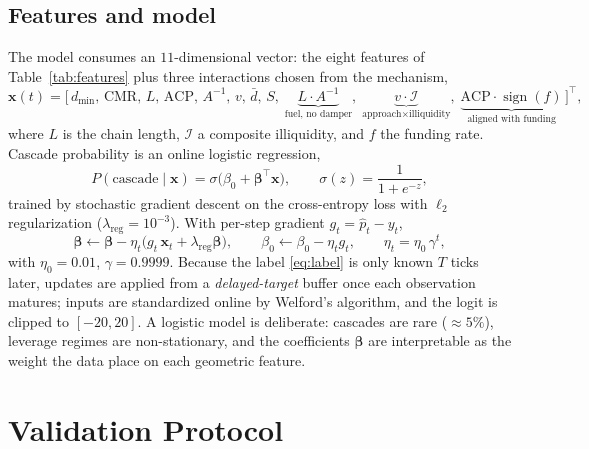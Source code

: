 \documentclass[11pt,a4paper]{article}
\theoremstyle{definition}
\theoremstyle{plain}
\newcommand{\sgn}{\operatorname{sign}}
\begin{document}
\subsection{Features and model}

The model consumes an $11$-dimensional vector: the eight features of Table~\ref{tab:features} plus
three interactions chosen from the mechanism,
\begin{equation}
  \mathbf{x}(t) = \big[\,d_{\min},\,\mathrm{CMR},\,L,\,\mathrm{ACP},\,A^{-1},\,v,\,\bar d,\,S,\;
                       \underbrace{L\!\cdot\!A^{-1}}_{\text{fuel, no damper}},\;
                       \underbrace{v\!\cdot\!\mathcal{I}}_{\text{approach}\times\text{illiquidity}},\;
                       \underbrace{\mathrm{ACP}\!\cdot\!\sgn(f)}_{\text{aligned with funding}}\,\big]^\top,
  \label{eq:xvec}
\end{equation}
where $L$ is the chain length, $\mathcal{I}$ a composite illiquidity, and $f$ the funding rate.
Cascade probability is an online logistic regression,
\begin{equation}
  P(\text{cascade}\mid \mathbf{x}) = \sigma\!\big(\beta_0 + \boldsymbol\beta^\top \mathbf{x}\big),
  \qquad \sigma(z) = \frac{1}{1+e^{-z}},
  \label{eq:logistic}
\end{equation}
trained by stochastic gradient descent on the cross-entropy loss with $\ell_2$ regularization
($\lambda_{\text{reg}} = 10^{-3}$). With per-step gradient $g_t = \hat p_t - y_t$,
\begin{equation}
  \boldsymbol\beta \leftarrow \boldsymbol\beta - \eta_t\big(g_t\,\mathbf{x}_t + \lambda_{\text{reg}}\boldsymbol\beta\big),
  \qquad \beta_0 \leftarrow \beta_0 - \eta_t g_t,
  \qquad \eta_t = \eta_0\,\gamma^t,
  \label{eq:sgd}
\end{equation}
with $\eta_0 = 0.01$, $\gamma = 0.9999$. Because the label \eqref{eq:label} is only known $T$ ticks
later, updates are applied from a \emph{delayed-target} buffer once each observation matures; inputs
are standardized online by Welford's algorithm, and the logit is clipped to $[-20,20]$. A logistic
model is deliberate: cascades are rare ($\approx 5\%$), leverage regimes are non-stationary, and the
coefficients $\boldsymbol\beta$ are interpretable as the weight the data place on each geometric
feature.

\section{Validation Protocol}
\label{sec:validation}
\end{document}
